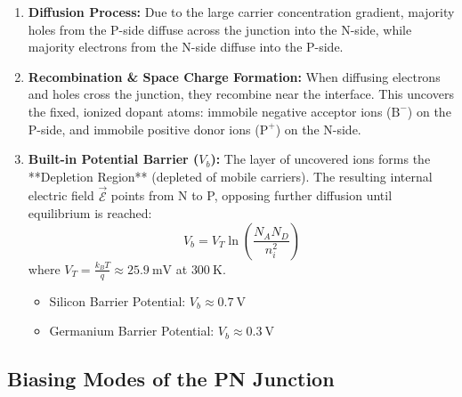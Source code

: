 \begin{enumerate}
    \item \textbf{Diffusion Process:} Due to the large carrier concentration gradient, majority holes from the P-side diffuse across the junction into the N-side, while majority electrons from the N-side diffuse into the P-side.
    \item \textbf{Recombination \& Space Charge Formation:} When diffusing electrons and holes cross the junction, they recombine near the interface. This uncovers the fixed, ionized dopant atoms: immobile negative acceptor ions ($\text{B}^-$) on the P-side, and immobile positive donor ions ($\text{P}^+$) on the N-side.
    \item \textbf{Built-in Potential Barrier ($V_b$):} The layer of uncovered ions forms the **Depletion Region** (depleted of mobile carriers). The resulting internal electric field $\vec{\mathcal{E}}$ points from N to P, opposing further diffusion until equilibrium is reached:
    \begin{equation}
        V_b = V_T \ln \left( \frac{N_A N_D}{n_i^2} \right)
    \end{equation}
    where $V_T = \frac{k_B T}{q} \approx \SI{25.9}{\milli\volt}$ at $\SI{300}{\kelvin}$.
    \begin{itemize}
        \item Silicon Barrier Potential: $V_b \approx \SI{0.7}{\volt}$
        \item Germanium Barrier Potential: $V_b \approx \SI{0.3}{\volt}$
    \end{itemize}
\end{enumerate}

\subsection{Biasing Modes of the PN Junction}

